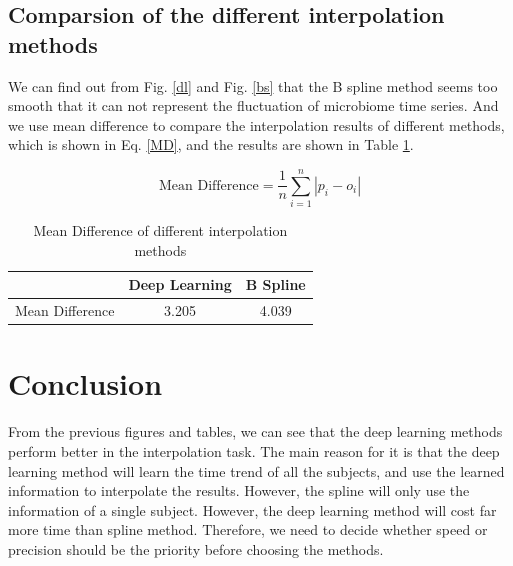 \documentclass[a4 paper]{article}
\begin{document}
\subsection{Comparsion of the different interpolation methods}

We can find out from Fig. \ref{dl} and Fig. \ref{bs} that the B spline method seems too smooth that it can not represent the fluctuation of microbiome time series. And we use mean difference to compare the interpolation results of different methods, which is shown in Eq. \ref{MD}, and the results are shown in Table \ref{results}.

\begin{equation}
\label{MD}
\text{Mean Difference} =\frac{1}{n} \sum_{i=1}^n|p_i-o_i|    
\end{equation}

\begin{table}[ht]
\centering
\caption{Mean Difference of different interpolation methods}
\begin{tabular}{|c|c|c|}
\hline
                & Deep Learning & B Spline \\ \hline
Mean Difference & 3.205         & 4.039    \\ \hline
\end{tabular}
\label{results}
\end{table}

\section{Conclusion}

From the previous figures and tables, we can see that the deep learning methods perform better in the interpolation task. The main reason for it is that the deep learning method will learn the time trend of all the subjects, and use the learned information to interpolate the results. However, the spline will only use the information of a single subject. However, the deep learning method will cost far more time than spline method. Therefore, we need to decide whether speed or precision should be the priority before choosing the methods.



\end{document}

